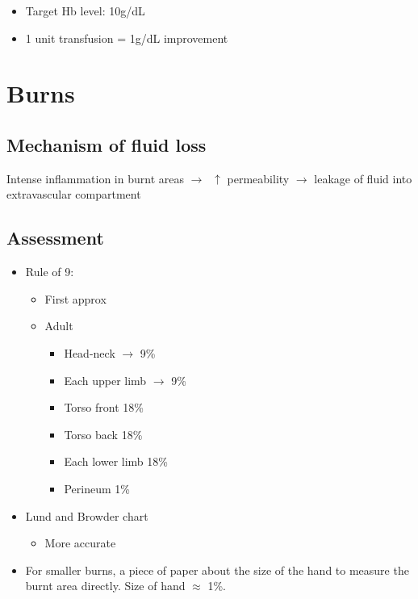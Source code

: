 \documentclass[
  12pt,
]{memoir}
\providecommand{\tightlist}{%
  \setlength{\itemsep}{0pt}\setlength{\parskip}{0pt}}
\begin{document}
\begin{itemize}
\tightlist
\item
  Target Hb level: 10g/dL
\item
  1 unit transfusion = 1g/dL improvement
\end{itemize}

\pagebreak

\hypertarget{burns}{%
\chapter{Burns}\label{burns}}

\hypertarget{mechanism-of-fluid-loss}{%
\section{Mechanism of fluid loss}\label{mechanism-of-fluid-loss}}

Intense inflammation in burnt areas \(\rightarrow\;\;\uparrow\)
permeability \(\rightarrow\) leakage of fluid into extravascular
compartment

\hypertarget{assessment}{%
\section{Assessment}\label{assessment}}

\begin{itemize}
\tightlist
\item
  Rule of 9:

  \begin{itemize}
  \tightlist
  \item
    First approx
  \item
    Adult

    \begin{itemize}
    \tightlist
    \item
      Head-neck \(\rightarrow\) 9\%
    \item
      Each upper limb \(\rightarrow\) 9\%
    \item
      Torso front 18\%
    \item
      Torso back 18\%
    \item
      Each lower limb 18\%
    \item
      Perineum 1\%
    \end{itemize}
  \end{itemize}
\item
  Lund and Browder chart

  \begin{itemize}
  \tightlist
  \item
    More accurate
  \end{itemize}
\item
  For smaller burns, a piece of paper about the size of the hand to
  measure the burnt area directly. Size of hand \(\approx\) 1\%.
\end{itemize}
\end{document}
